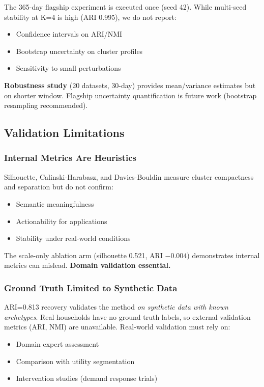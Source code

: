 The 365-day flagship experiment is executed once (seed 42). While multi-seed stability at K=4 is high (ARI 0.995), we do not report:
\begin{itemize}
    \item Confidence intervals on ARI/NMI
    \item Bootstrap uncertainty on cluster profiles
    \item Sensitivity to small perturbations
\end{itemize}

\textbf{Robustness study} (20 datasets, 30-day) provides mean/variance estimates but on shorter window. Flagship uncertainty quantification is future work (bootstrap resampling recommended).

\subsection{Validation Limitations}

\subsubsection{Internal Metrics Are Heuristics}

Silhouette, Calinski-Harabasz, and Davies-Bouldin measure cluster compactness and separation but do not confirm:
\begin{itemize}
    \item Semantic meaningfulness
    \item Actionability for applications
    \item Stability under real-world conditions
\end{itemize}

The scale-only ablation arm (silhouette 0.521, ARI $-0.004$) demonstrates internal metrics can mislead. \textbf{Domain validation essential.}

\subsubsection{Ground Truth Limited to Synthetic Data}

ARI=0.813 recovery validates the method \emph{on synthetic data with known archetypes}. Real households have no ground truth labels, so external validation metrics (ARI, NMI) are unavailable. Real-world validation must rely on:
\begin{itemize}
    \item Domain expert assessment
    \item Comparison with utility segmentation
    \item Intervention studies (demand response trials)
\end{itemize}

